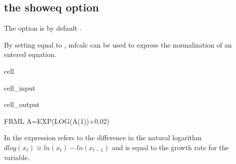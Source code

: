 \documentclass[letterpaper,10pt,english]{jupyterBook}
\begin{document}
\subsection{ \sphinxhyphen{} the showeq option}
\label{\detokenize{content/04_PythonEssentials/mfcalc:mfcalc-the-showeq-option}}
\sphinxAtStartPar
The  option is by default .

\sphinxAtStartPar
By setting equal to , mfcalc can be used to express the normalization of an entered equation.

\begin{sphinxuseclass}{cell}\begin{sphinxVerbatimInput}

\begin{sphinxuseclass}{cell_input}
\begin{sphinxVerbatim}[commandchars=\\\{\}]
\end{sphinxVerbatim}

\end{sphinxuseclass}\end{sphinxVerbatimInput}
\begin{sphinxVerbatimOutput}

\begin{sphinxuseclass}{cell_output}
\begin{sphinxVerbatim}[commandchars=\\\{\}]
FRML \PYGZlt{}\PYGZgt{} A=EXP(LOG(A(\PYGZhy{}1))+0.02)\PYGZdl{}
\end{sphinxVerbatim}

\end{sphinxuseclass}\end{sphinxVerbatimOutput}

\end{sphinxuseclass}
\sphinxAtStartPar
In  the expression  refers to the difference in the natural logarithm \(dlog(x_t) \equiv ln(x_t)-ln(x_{t-1})\) and is equal to the growth rate for the variable.
\end{document}
